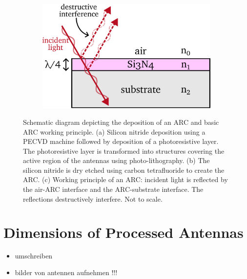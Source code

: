 \begin{figure}[!]
\begin{subfigure}[b]{0.21\textwidth}
        \caption{\centering}
        \label{fig:fabarc2}
    \end{subfigure}
    \hfill
    \begin{subfigure}[b]{0.45\textwidth}
        \centering
        \includegraphics[width=\textwidth]{figures/Fabrication/ARC.pdf}
        \caption{\centering}
        \label{fig:fabarc}
    \end{subfigure}
    \caption{Schematic diagram depicting the deposition of an ARC and basic ARC working principle. (a) Silicon nitride deposition using a PECVD machine followed by deposition of a photoresistive layer. The photoresistive layer is transformed into structures covering the active region of the antennas using photo-lithography. (b) The silicon nitride is dry etched using carbon tetrafluoride to create the ARC. (c) Working principle of an ARC: incident light is reflected by the air-ARC interface and the ARC-substrate interface. The reflections destructively interfere. Not to scale.}
\end{figure}

\section{Dimensions of Processed Antennas}

\begin{itemize}
    \item umschreiben 
    \item bilder von antennen aufnehmen !!!
\end{itemize}

